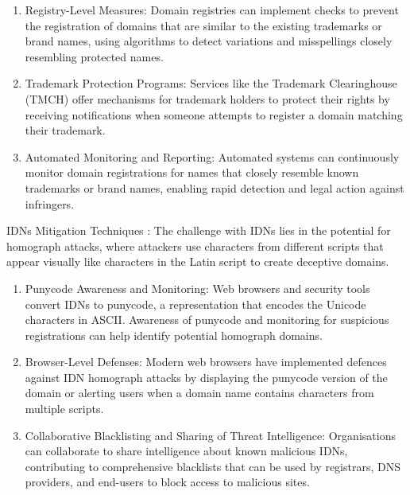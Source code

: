 \begin{enumerate}
  \item Registry-Level Measures: Domain registries can implement checks to prevent the registration of domains that are similar to the existing trademarks or brand names, using algorithms to detect variations and misspellings closely resembling protected names. \cite{WTR2020} 
  \item Trademark Protection Programs: Services like the Trademark Clearinghouse (TMCH) offer mechanisms for trademark holders to protect their rights by receiving notifications when someone attempts to register a domain matching their trademark. \cite{ICANNTMCH}
  \item Automated Monitoring and Reporting: Automated systems can continuously monitor domain registrations for names that closely resemble known trademarks or brand names, enabling rapid detection and legal action against infringers. \cite{TMCH2023}
\end{enumerate}

IDNs Mitigation Techniques : The challenge with IDNs lies in the potential for homograph attacks, where attackers use characters from different scripts that appear visually like characters in the Latin script to create deceptive domains.

\begin{enumerate}
  \item Punycode Awareness and Monitoring: Web browsers and security tools convert IDNs to punycode, a representation that encodes the Unicode characters in ASCII. Awareness of punycode and monitoring for suspicious registrations can help identify potential homograph domains. \cite{SOCRadar2023}
  \item Browser-Level Defenses: Modern web browsers have implemented defences against IDN homograph attacks by displaying the punycode version of the domain or alerting users when a domain name contains characters from multiple scripts. \cite{Malwarebytes2017}
  \item Collaborative Blacklisting and Sharing of Threat Intelligence: Organisations can collaborate to share intelligence about known malicious IDNs, contributing to comprehensive blacklists that can be used by registrars, DNS providers, and end-users to block access to malicious sites. \cite{CyberThreatAlliance2023}
  
\end{enumerate}

